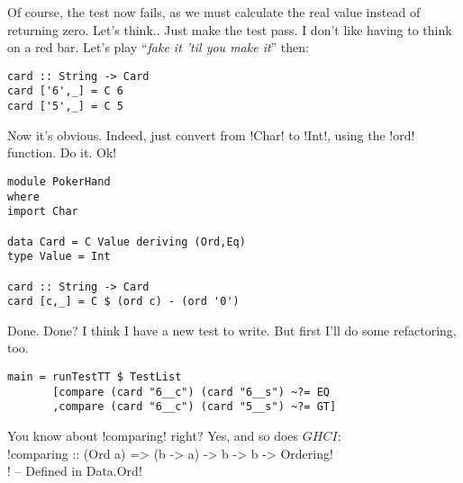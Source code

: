 \failure Of course, the test now fails, as we must calculate the real value instead of returning zero. Let's think..
\lhN \failure Just make the test pass. I don't like having to think on a red bar.
\lhA \failure Let's play ``\emph{fake it 'til you make it}'' then:
\begin{lstlisting}[frame=single]
card :: String -> Card
card ['6',_] = C 6
card ['5',_] = C 5 
\end{lstlisting}
\success Now it's obvious.
\lhN \success Indeed, just convert from \il!Char! to \il!Int!, using the \il!ord! function. Do it.
\lhA \success Ok!
\begin{lstlisting}[frame=single]
module PokerHand
where
import Char

data Card = C Value deriving (Ord,Eq)
type Value = Int

card :: String -> Card
card [c,_] = C $ (ord c) - (ord '0')
\end{lstlisting} %
\success Done.
\lhN Done? I think I have a new test to write. But first I'll do some refactoring, too.
\begin{lstlisting}[frame=single]
main = runTestTT $ TestList 
       [compare (card "6__c") (card "6__s") ~?= EQ
       ,compare (card "6__c") (card "5__s") ~?= GT]
\end{lstlisting} %
You know about \il!comparing! right?
\lhA Yes, and so does $GHCI$: \\

\il!comparing :: (Ord a) => (b -> a) -> b -> b -> Ordering! \\
\il! -- Defined in Data.Ord! \\



